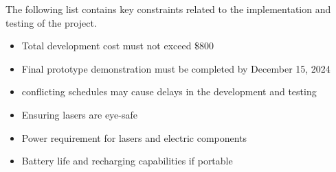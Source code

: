 The following list contains key constraints related to the implementation and testing of the project.

\begin{itemize}
  \item Total development cost must not exceed \$800
  \item Final prototype demonstration must be completed by December 15, 2024
  \item conflicting schedules may cause delays in the development and testing
  \item Ensuring lasers are eye-safe
  \item Power requirement for lasers and electric components
  \item Battery life and recharging capabilities if portable
\end{itemize}
